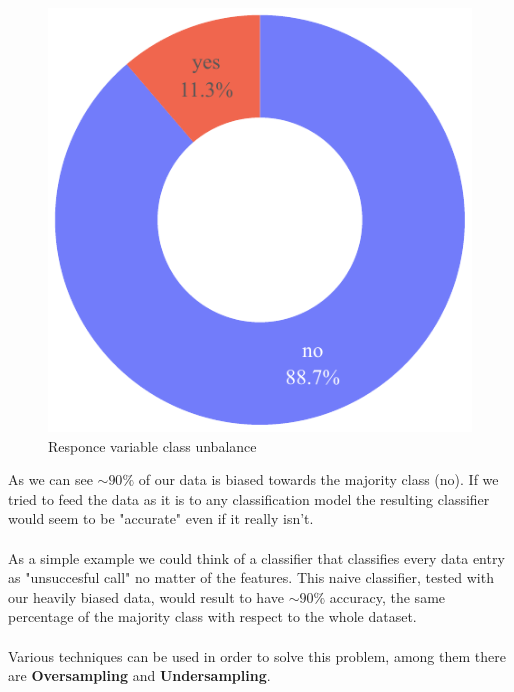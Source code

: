 \begin{figure}[H]
    \centering
    \includegraphics[scale=0.8]{pictures/pieplot_unbalance.pdf}

    \caption{Responce variable class unbalance}
\end{figure}

As we can see $\sim 90\%$ of our data is biased towards the majority class (no). If we tried to feed the data as it is to any classification model the resulting classifier would seem to be "accurate" even if it really isn't.\\
\\
As a simple example we could think of a classifier that classifies every data entry as "unsuccesful call" no matter of the features. This naive classifier, tested with our heavily biased data, would result to have $\sim 90\%$ accuracy, the same percentage of the majority class with respect to the whole dataset.\\
\\
Various techniques can be used in order to solve this problem, among them there are \textbf{Oversampling} and \textbf{Undersampling}. 

